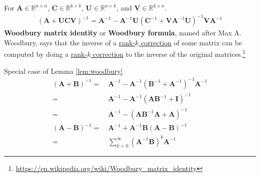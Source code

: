 \begin{lemma}\label{lem:woodbury}
    For $\mathbf{A}\in\mathbb{R}^{n\times n}$, $\mathbf{C}\in\mathbb{R}^{k\times k}$, 
    $\mathbf{U}\in\mathbb{R}^{n\times k}$, and $\mathbf{V}\in\mathbb{R}^{k\times n}$.
    \begin{gather}
        (\mathbf{A}+\mathbf{UCV})^{-1} 
        = \mathbf{A}^{-1} 
        - \mathbf{A}^{-1}\mathbf{U}(
            \mathbf{C}^{-1}
            + \mathbf{VA}^{-1}\mathbf{U}
        )^{-1}\mathbf{VA}^{-1}
    \end{gather}
    \textbf{Woodbury matrix identity} or \textbf{Woodbury formula},
    named after Max A. Woodbury, says that the inverse of a \uline{rank-$k$ correction} of some matrix 
    can be computed by doing a \uline{rank-$k$ correction} to the inverse of the original matrices.\footnote{\hyperlink{https://en.wikipedia.org/wiki/Woodbury_matrix_identity}{https://en.wikipedia.org/wiki/Woodbury\_matrix\_identity}}
\end{lemma}

\begin{lemma}\label{lem:invsum}
    Special case of Lemma \ref{lem:woodbury}
    \begin{align}
        (\mathbf{A} + \mathbf{B})^{-1} 
        =&~ \mathbf{A}^{-1} - \mathbf{A}^{-1}(\mathbf{B}^{-1} + \mathbf{A}^{-1})^{-1}\mathbf{A}^{-1}\\
        =&~ \mathbf{A}^{-1} - \mathbf{A}^{-1}(\mathbf{AB}^{-1} + \mathbf{I})^{-1} \\
        =&~ \mathbf{A}^{-1} - (\mathbf{AB}^{-1}\mathbf{A} + \mathbf{A})^{-1} \\
        (\mathbf{A} - \mathbf{B})^{-1}
        =&~ \mathbf{A}^{-1} + \mathbf{A}^{-1}\mathbf{B}(\mathbf{A} - \mathbf{B})^{-1} \\
        =&~ \sum_{k=0}^\infty (\mathbf{A}^{-1}\mathbf{B})^k\mathbf{A}^{-1}
    \end{align}
\end{lemma}

